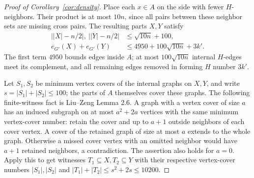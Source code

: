 \documentclass[11pt]{article}
\begin{document}
\begin{proof}[Proof of Corollary~\ref{cor:density}]
Place each $x\in A$ on the side with fewer $H$-neighbors. Their product
is at most $10n$, since all pairs between these neighbor sets are missing
cross pairs. The resulting parts $X,Y$ satisfy
\begin{equation}\label{eq:small-partition}
\begin{aligned}
\bigl||X|-n/2\bigr|,\ \bigl||Y|-n/2\bigr|&\le\sqrt{10n}+100,\\
e_{G'}(X)+e_{G'}(Y)&\le4950+100\sqrt{10n}+3k'.
\end{aligned}
\end{equation}
The first term $4950$ bounds edges inside $A$; at most
$100\sqrt{10n}$ internal $H$-edges meet its complement, and all
remaining edges removed in forming $H$ number $3k'$.

Let $S_1,S_2$ be minimum vertex covers of the internal graphs on $X,Y$,
and write $s=|S_1|+|S_2|\le100$; the parts of $A$ themselves cover
these graphs. The following finite-witness fact is Liu--Zeng Lemma 2.6.
A graph with a vertex cover of size $a$ has an induced subgraph on at
most $a^2+2a$ vertices with the same minimum vertex-cover number:
retain the cover and up to $a+1$ outside neighbors of each cover
vertex. A cover of the retained graph of size at most $a$ extends
to the whole graph. Otherwise a missed cover vertex with an omitted
neighbor would have $a+1$ retained neighbors, a contradiction.
The assertion also holds for $a=0$.
Apply this to get witnesses $T_1\subseteq X,T_2\subseteq Y$ with their
respective vertex-cover numbers $|S_1|,|S_2|$ and
$|T_1|+|T_2|\le s^2+2s\le10200$.


\end{proof}
\end{document}
